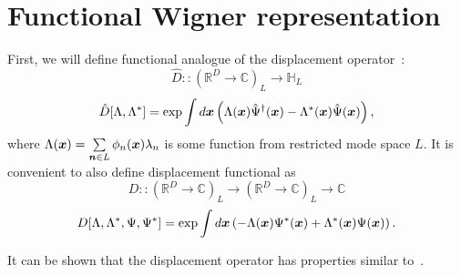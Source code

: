 \section{Functional Wigner representation}

First, we will define functional analogue of the displacement operator~:
\[
	\hat{D} ::
	(\mathbb{R}^D \rightarrow \mathbb{C})_L
	\rightarrow
	\mathbb{H}_L
\]
\[
	\hat{D}[\Lambda, \Lambda^*] = \exp \int d\boldsymbol{x} \left(
		\Lambda(\boldsymbol{x}) \hat{\Psi}^\dagger(\boldsymbol{x}) - \Lambda^*(\boldsymbol{x}) \hat{\Psi}(\boldsymbol{x})
	\right),
\]
where $\Lambda(\boldsymbol{x}) = \sum\limits_{\boldsymbol{n} \in L} \phi_n(\boldsymbol{x}) \lambda_n$ is some function from restricted mode space $L$.
It is convenient to also define displacement functional as
\[
	D ::
	(\mathbb{R}^D \rightarrow \mathbb{C})_L
	\rightarrow
	(\mathbb{R}^D \rightarrow \mathbb{C})_L
	\rightarrow
	\mathbb{C}
\]
\[
	D[\Lambda, \Lambda^*, \Psi, \Psi^*] = \exp \int d\boldsymbol{x} \left(
		-\Lambda(\boldsymbol{x}) \Psi^*(\boldsymbol{x}) + \Lambda^*(\boldsymbol{x}) \Psi(\boldsymbol{x})
	\right).
\]

It can be shown that the displacement operator has properties similar to~.

